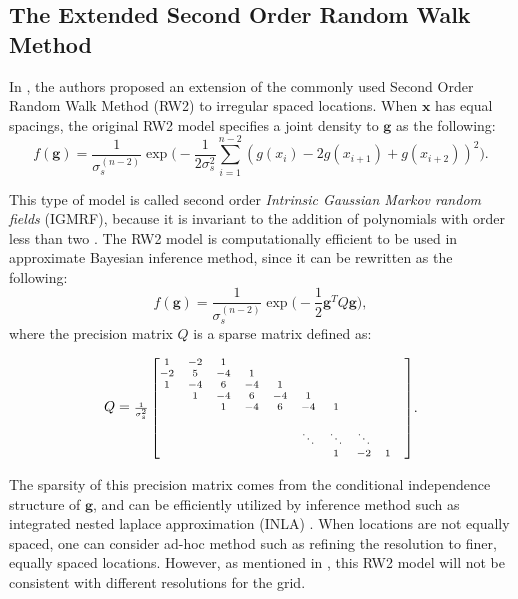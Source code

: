\documentclass{article}
\begin{document}
\subsection{The Extended Second Order Random Walk Method}

In \cite{rw2}, the authors proposed an extension of the commonly used Second Order Random Walk Method (RW2) to irregular spaced locations. When $\boldsymbol{x}$ has equal spacings, the original RW2 model specifies a joint density to $\boldsymbol{g}$ as the following:
\begin{equation}\label{oldrw2}
f(\boldsymbol{g}) = \frac{1}{\sigma_s^{(n-2)}} \exp \bigg( -\frac{1}{2 \sigma_s^2} \sum_{i=1}^{n-2} (g(x_i) - 2g(x_{i+1}) + g(x_{i+2}))^2 \bigg).
\end{equation}

This type of model is called second order \textit{Intrinsic Gaussian Markov random fields} (IGMRF), because it is invariant to the addition of polynomials with order less than two \citep{rue2005gaussian}. The RW2 model is computationally efficient to be used in approximate Bayesian inference method, since it can be rewritten as the following:
\begin{equation}\label{alter-oldrw2}
f(\boldsymbol{g}) = \frac{1}{\sigma_s^{(n-2)}} \exp \bigg( -\frac{1}{2} \boldsymbol{g}^T Q \boldsymbol{g}  \bigg),
\end{equation}
where the precision matrix $Q$ is a sparse matrix defined as:

\begin{equation}
\begin{aligned}
Q = \mbox{\scriptsize $ \frac{1}{\sigma_s^2} \begin{bmatrix}
1 & -2 & 1 &  &  &  & &  & & \\
-2 & 5 & -4 & 1 &  &  & &  & & \\
1 & -4 & 6  & -4 & 1 &  & &  & & \\
 & 1 & -4 & 6  & -4  & 1  & &  & & \\
 &  & 1 & -4 & 6  & -4  & 1  & & & \\
 & &  & & & & & & & \\
  & &  & & & \ddots & \ddots & \ddots & & \\
   &  &  &  &   &   &  1 &-2 & 1 & \\
\end{bmatrix}
$}
\end{aligned}.
\end{equation}

The sparsity of this precision matrix comes from the conditional independence structure of $\boldsymbol{g}$, and can be efficiently utilized by inference method such as integrated nested laplace approximation (INLA) \citep{inla}. When locations are not equally spaced, one can consider ad-hoc method such as refining the resolution to finer, equally spaced locations. However, as mentioned in \cite{rue2005gaussian}, this RW2 model will not be consistent with different resolutions for the grid.
\end{document}
